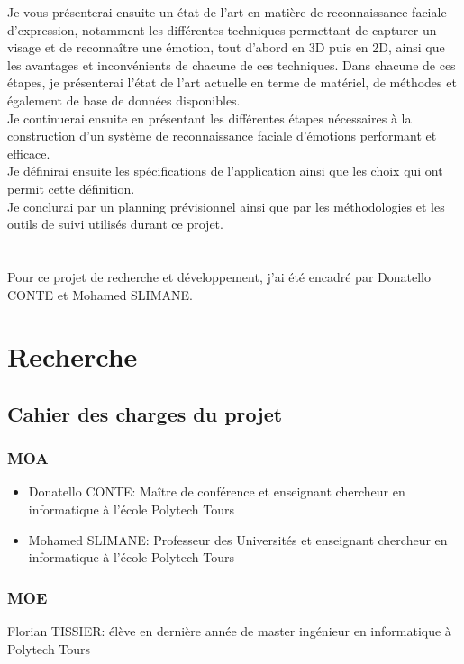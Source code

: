 \documentclass[poster]{polytech/polytech}
\begin{document}
Je vous présenterai ensuite un état de l'art en matière de reconnaissance faciale d'expression, notamment les différentes techniques permettant de capturer un visage et de reconnaître une émotion, tout d'abord en 3D puis en 2D, ainsi que les avantages et inconvénients de chacune de ces techniques. Dans chacune de ces étapes, je présenterai l'état de l'art actuelle en terme de matériel, de méthodes et également de base de données disponibles. \\
Je continuerai ensuite en présentant les différentes étapes nécessaires à la construction d'un système de reconnaissance faciale d'émotions performant et efficace.\\
Je définirai ensuite les spécifications de l'application ainsi que les choix qui ont permit cette définition.\\
Je conclurai par un planning prévisionnel ainsi que par les méthodologies et les outils de suivi utilisés durant ce projet.\\
\\
\\
Pour ce projet de recherche et développement, j'ai été encadré par Donatello CONTE et Mohamed SLIMANE.


\part{Recherche}
\label{part:part_recherche}

\chapter{Cahier des charges du projet}
\label{chap:chap_cdc}

\section{MOA}
\begin{itemize}
\item Donatello CONTE: Maître de conférence et enseignant chercheur en informatique à l'école Polytech Tours
\item Mohamed SLIMANE: Professeur des Universités et enseignant chercheur en informatique à l'école Polytech Tours
\end{itemize}

\section{MOE}
Florian TISSIER: élève en dernière année de master ingénieur en informatique à Polytech Tours
\end{document}

